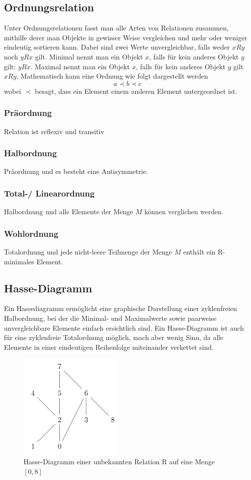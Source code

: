 \documentclass{article}
\begin{document}
\subsection{Ordnungsrelation}
Unter Ordnungsrelationen fasst man alle Arten von Relationen zusammen, mithilfe derer man Objekte in gewisser Weise vergleichen und mehr oder weniger eindeutig sortieren kann. Dabei sind zwei Werte unvergleichbar, falls weder $xRy$ noch $yRx$ gilt. Minimal nennt man ein Objekt $x$, falls für kein anderes Objekt $y$ gilt: $yRx$. Maximal nennt man ein Objekt $x$, falls für kein anderes Objekt $y$ gilt $xRy$.
Mathematisch kann eine Ordnung wie folgt dargestellt werden 
$$a \prec b \prec c$$ wobei $\prec$ besagt, dass ein Element einem anderen Element untergeordnet ist.
\subsubsection{Präordnung}
Relation ist reflexiv und transitiv
\subsubsection{Halbordnung}
Präordnung und es besteht eine Antisymmetrie.
\subsubsection{Total-/ Linearordnung}
Halbordnung und alle Elemente der Menge $M$ können verglichen werden.
\subsubsection{Wohlordnung}
Totalordnung und jede nicht-leere Teilmenge der Menge $M$ enthält ein R-minimales Element.

\subsection{Hasse-Diagramm}
Ein Hassediagramm ermöglicht eine graphische Darstellung einer zyklenfreien Halbordnung, bei der die Minimal- und Maximalwerte sowie paarweise unvergleichbare Elemente einfach ersichtlich sind. Ein Hasse-Diagramm ist auch für eine zyklenfreie Totalordnung möglich, mach aber wenig Sinn, da alle Elemente in einer eindeutigen Reihenfolge miteinander verkettet sind.
\begin{figure}[h]
		\begin{center}
		\includegraphics[width=5cm]{img/hasse.png}
		\end{center}
		\caption{Hasse-Diagramm einer unbekannten Relation R auf eine Menge $[0,8]$}
		\label{fig:}
\end{figure}
\end{document}
